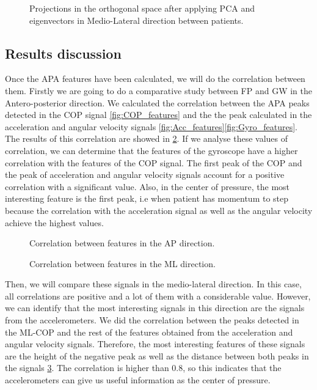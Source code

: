 \begin{figure}[H]
	\centering
	\caption{Projections in the orthogonal space after applying PCA and eigenvectors in Medio-Lateral direction between patients.}
	\label{fig:PCA_ML_patients}
\end{figure}


\subsection{Results discussion}
Once the APA features have been calculated, we will do the correlation between them. Firstly we are going to do a comparative study between FP and GW in the Antero-posterior direction. We calculated the correlation between the APA peaks detected in the COP signal \ref{fig:COP_features} and the the peak calculated in the acceleration and angular velocity signals \ref{fig:Acc_features}\ref{fig:Gyro_features}. The results of this correlation are showed in \ref{fig:Corr_AP}. If we analyse these values of correlation, we can determine that the features of the gyroscope have a higher correlation with the features of the COP signal. The first peak of the COP and the peak of acceleration and angular velocity signals account for a positive correlation with a significant value. Also, in the center of pressure, the most interesting feature is the first peak, i.e when patient has momentum to step because the correlation with the acceleration signal as well as the angular velocity achieve the highest values.

\begin{figure}[H]
	\centering
	\caption{Correlation between features in the AP direction.}
	\label{fig:Corr_AP}
\end{figure}

\begin{figure}[H]
	\centering
	\caption{Correlation between features in the ML direction.}
	\label{fig:Corr_ML}
\end{figure}

Then, we will compare these signals in the medio-lateral direction. In this case, all correlations are positive and a lot of them with a considerable value. However, we can identify that the most interesting signals in this direction are the signals from the accelerometers. We did the correlation between the peaks detected in the ML-COP and the rest of the features obtained from the acceleration and angular velocity signals. Therefore, the most interesting features of these signals are the height of the negative peak as well as the distance between both peaks in the signals \ref{fig:Corr_ML}. The correlation is higher than 0.8, so this indicates that the accelerometers can give us useful information as the center of pressure.

